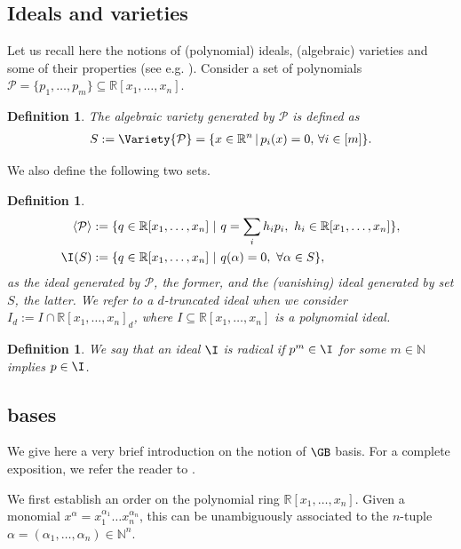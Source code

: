\documentclass[11pt]{article}
\newtheorem{definition}[theorem]{Definition}
\begin{document}
\subsection*{Ideals and varieties}
Let us recall here the notions of (polynomial) ideals, (algebraic) varieties and some of their properties (see e.g. \cite{Cox}).
%
Consider a set of polynomials $\mathcal{P} = \{p_1,\ldots,p_m\} \subseteq \mathbb{R}[x_1, \dots, x_n]$. 
\begin{definition}
    The \textit{algebraic variety generated by $\mathcal{P}$} is defined as
    \begin{align*}
        S:= \Variety{\mathcal{P}} = \{x \in \mathbb{R}^n \, | \, p_i(x) = 0, \, \forall i \in [m] \}.
    \end{align*}
\end{definition}
%
We also define the following two sets.
%
\begin{definition}
        \begin{align*}
        \langle \mathcal{P} \rangle &:= \{q \in \mathbb{R}[x_1, \dots, x_n] \ | \ q = \sum_i h_i p_i, \ h_i \in \mathbb{R}[x_1, \dots, x_n]\}, \\
        \I(S) &:= \{ q \in \mathbb{R}[x_1, \dots, x_n] \ | \ q(\alpha) = 0, \ \forall \alpha \in S\},
    \end{align*}
    as the \emph{ideal generated by $\mathcal{P}$}, the former, and the \emph{(vanishing) ideal generated by set $S$}, the latter. We refer to a \emph{$d$-truncated ideal} when we consider $I_d := I \cap \mathbb{R}[x_1, \dots, x_n]_d$, where $I \subseteq \mathbb{R}[x_1, \dots, x_n]$ is a polynomial ideal.
\end{definition}

\begin{definition}\label{def:radical}
    We say that an ideal $\I$ is \emph{radical} if $p^m \in \I$ for some $m \in \mathbb{N}$ implies $p \in \I$.
\end{definition}

\subsection*{\GB bases}

We give here a very brief introduction on the notion of $\GB$ basis. For a complete exposition, we refer the reader to \cite{Cox}.

We first establish an order on the polynomial ring $\mathbb{R}[x_1, \ldots, x_n]$. Given a monomial $x^{\alpha} = x_1^{\alpha_1} \dots x_n^{\alpha_n}$, this can be unambiguously associated to the $n$-tuple $\alpha = (\alpha_1, \ldots, \alpha_n) \in \mathbb{N}^n$.
\end{document}
